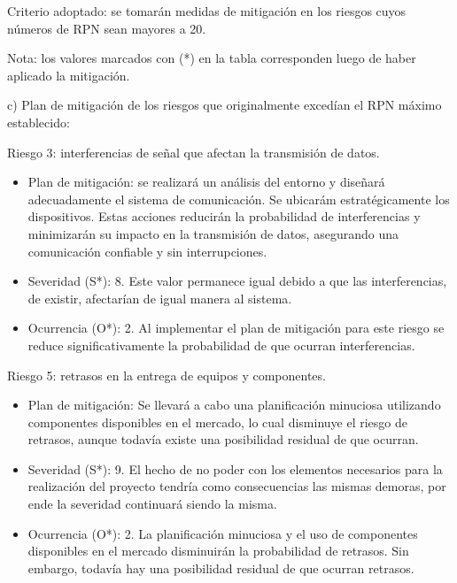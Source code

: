 \documentclass[
11pt, %
]{charter}
\begin{document}
\pagebreak

Criterio adoptado: se tomarán medidas de mitigación en los riesgos cuyos números de RPN sean mayores a 20.

Nota: los valores marcados con (*) en la tabla corresponden luego de haber aplicado la mitigación.


c) Plan de mitigación de los riesgos que originalmente excedían el RPN máximo establecido:
 

Riesgo 3: interferencias de señal que afectan la transmisión de datos.
\begin{itemize}
	\item Plan de mitigación: se realizará un análisis del entorno y diseñará adecuadamente el sistema de comunicación. Se ubicarám estratégicamente los dispositivos. Estas acciones reducirán la probabilidad de interferencias y minimizarán su impacto en la transmisión de datos, asegurando una comunicación confiable y sin interrupciones.
	\item Severidad (S*): 8. Este valor permanece igual debido a que las interferencias, de existir, afectarían de igual manera al sistema.
	\item Ocurrencia (O*): 2. Al implementar el plan de mitigación para este riesgo se reduce significativamente la probabilidad de que ocurran interferencias.
\end{itemize}

Riesgo 5: retrasos en la entrega de equipos y componentes.
\begin{itemize}
	\item Plan de mitigación: Se llevará a cabo una planificación minuciosa utilizando componentes disponibles en el mercado, lo cual disminuye el riesgo de retrasos, aunque todavía existe una posibilidad residual de que ocurran.
	\item Severidad (S*): 9. El hecho de no poder con los elementos necesarios para la realización del proyecto tendría como consecuencias las mismas demoras, por ende la severidad continuará siendo la misma.
	\item Ocurrencia (O*): 2. La planificación minuciosa y el uso de componentes disponibles en el mercado disminuirán la probabilidad de retrasos. Sin embargo, todavía hay una posibilidad residual de que ocurran retrasos.
\end{itemize}
\end{document}
